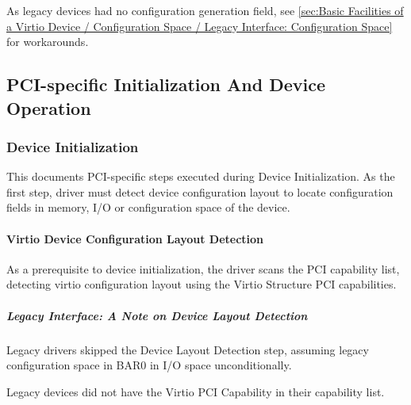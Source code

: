 As legacy devices had no configuration generation field,
see \ref{sec:Basic Facilities of a Virtio Device / Configuration Space / Legacy Interface: Configuration Space}~ for workarounds.

\subsection{PCI-specific Initialization And Device Operation}\label{sec:Virtio Transport Options / Virtio Over PCI Bus / PCI-specific Initialization And Device Operation}

\subsubsection{Device Initialization}\label{sec:Virtio Transport Options / Virtio Over PCI Bus / PCI-specific Initialization And Device Operation / Device Initialization}

This documents PCI-specific steps executed during Device Initialization.
As the first step, driver must detect device configuration layout
to locate configuration fields in memory, I/O or configuration space of the
device.

\paragraph{Virtio Device Configuration Layout Detection}\label{sec:Virtio Transport Options / Virtio Over PCI Bus / PCI-specific Initialization And Device Operation / Device Initialization / Virtio Device Configuration Layout Detection}

As a prerequisite to device initialization, the driver scans the
PCI capability list, detecting virtio configuration layout using the Virtio
Structure PCI capabilities.

\subparagraph{Legacy Interface: A Note on Device Layout Detection}\label{sec:Virtio Transport Options / Virtio Over PCI Bus / PCI-specific Initialization And Device Operation / Device Initialization / Virtio Device Configuration Layout Detection / Legacy Interface: A Note on Device Layout Detection}

Legacy drivers skipped the Device Layout Detection step, assuming legacy
configuration space in BAR0 in I/O space unconditionally.

Legacy devices did not have the Virtio PCI Capability in their
capability list.

